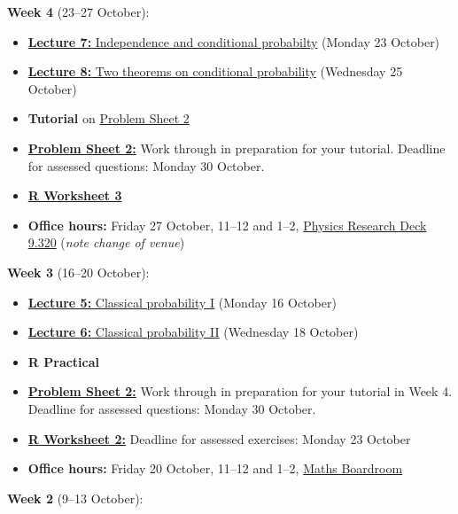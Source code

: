 \documentclass[
  a4paper,
]{book}
\providecommand{\tightlist}{%
  \setlength{\itemsep}{0pt}\setlength{\parskip}{0pt}}
\theoremstyle{definition}
\theoremstyle{definition}
\theoremstyle{definition}
\theoremstyle{definition}
\theoremstyle{remark}
\begin{document}
\textbf{Week 4} (23--27 October):

\begin{itemize}
\tightlist
\item
  \protect\hyperlink{L07-conditional}{\textbf{Lecture 7:} Independence and conditional probabilty} (Monday 23 October)
\item
  \protect\hyperlink{L08-two-theorems}{\textbf{Lecture 8:} Two theorems on conditional probability} (Wednesday 25 October)
\item
  \textbf{Tutorial} on \protect\hyperlink{P2}{Problem Sheet 2}
\item
  \protect\hyperlink{P2}{\textbf{Problem Sheet 2:}} Work through in preparation for your tutorial. Deadline for assessed questions: Monday 30 October.
\item
  \protect\hyperlink{R}{\textbf{R Worksheet 3}}
\item
  \textbf{Office hours:} Friday 27 October, 11--12 and 1--2, \href{https://mpaldridge.github.io/office.html}{Physics Research Deck 9.320} (\emph{note change of venue})
\end{itemize}

\textbf{Week 3} (16--20 October):

\begin{itemize}
\tightlist
\item
  \protect\hyperlink{L05-classical-i}{\textbf{Lecture 5:} Classical probability I} (Monday 16 October)
\item
  \protect\hyperlink{L06-classical-ii}{\textbf{Lecture 6:} Classical probability II} (Wednesday 18 October)
\item
  \textbf{R Practical}
\item
  \protect\hyperlink{P2}{\textbf{Problem Sheet 2:}} Work through in preparation for your tutorial in Week 4. Deadline for assessed questions: Monday 30 October.
\item
  \protect\hyperlink{R}{\textbf{R Worksheet 2:}} Deadline for assessed exercises: Monday 23 October
\item
  \textbf{Office hours:} Friday 20 October, 11--12 and 1--2, \href{boardroom.png}{Maths Boardroom}
\end{itemize}

\textbf{Week 2} (9--13 October):
\end{document}
